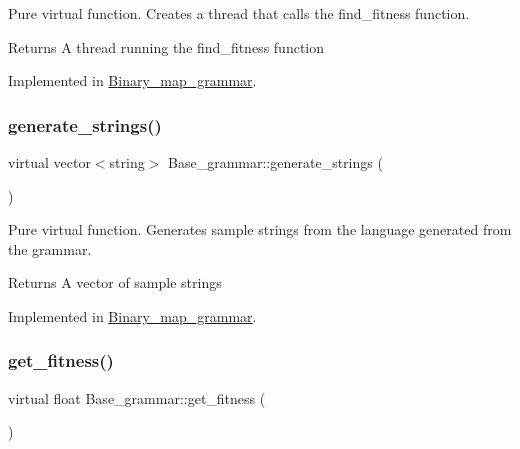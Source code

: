 Pure virtual function. Creates a thread that calls the find\+\_\+fitness function. 

\begin{DoxyReturn}{Returns}
A thread running the find\+\_\+fitness function 
\end{DoxyReturn}


Implemented in \mbox{\hyperlink{classBinary__map__grammar_a331b929d28960fb4fda2bf9f863349f1}{Binary\+\_\+map\+\_\+grammar}}.

\mbox{\label{classBase__grammar_a19197d28ad3c12d15cd97a8d10832dda}} 
\subsubsection{\texorpdfstring{generate\_strings()}{generate\_strings()}}
{\footnotesize\ttfamily virtual vector$<$string$>$ Base\+\_\+grammar\+::generate\+\_\+strings (\begin{DoxyParamCaption}{ }\end{DoxyParamCaption})\hspace{0.3cm}{\ttfamily [pure virtual]}}



Pure virtual function. Generates sample strings from the language generated from the grammar. 

\begin{DoxyReturn}{Returns}
A vector of sample strings 
\end{DoxyReturn}


Implemented in \mbox{\hyperlink{classBinary__map__grammar_adf7b6f59466f209246cb5f816b9cb68d}{Binary\+\_\+map\+\_\+grammar}}.

\mbox{\label{classBase__grammar_a8fb451c59454f03cfc0fb4a676894a39}} 
\subsubsection{\texorpdfstring{get\_fitness()}{get\_fitness()}}
{\footnotesize\ttfamily virtual float Base\+\_\+grammar\+::get\+\_\+fitness (\begin{DoxyParamCaption}{ }\end{DoxyParamCaption})\hspace{0.3cm}{\ttfamily [pure virtual]}}



